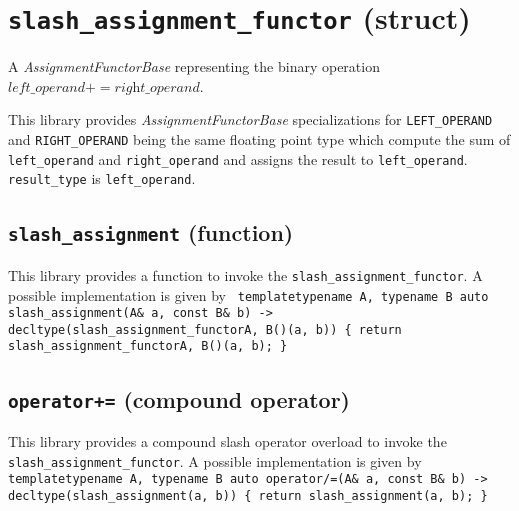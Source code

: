 \section{\texttt{slash\_assignment\_functor} (struct)}
A \textit{AssignmentFunctorBase} representing the binary operation $\textit{left\_operand} += \textit{right\_operand}$.\newline

\noindent{}This library provides \textit{AssignmentFunctorBase} specializations for
\texttt{LEFT\_OPERAND} and \texttt{RIGHT\_OPERAND} being the same    floating point
type which compute  the sum of  \texttt{left\_operand} and \texttt{right\_operand}
and assigns the result to \texttt{left\_operand}.
\texttt{result\_type} is \texttt{left\_operand}.

\subsection{\texttt{slash\_assignment} (function)}
This library provides a function to invoke the \texttt{slash\_assignment\_functor}.
A possible implementation is given by\newline
\texttt{
template\textlangle typename A, typename B\textrangle\newline
auto slash\_assignment(A\& a, const B\& b) -> decltype(slash\_assignment\_functor\textlangle A, B\textrangle()(a, b))\newline
\{ return slash\_assignment\_functor\textlangle A, B\textrangle()(a, b); \}
}

\subsection{\texttt{operator+=} (compound operator)}
This library provides a compound slash operator overload to invoke the \texttt{slash\_assignment\_functor}.
A possible implementation is given by\newline
\texttt{
template\textlangle typename A, typename B\textrangle\newline
auto operator/=(A\& a, const B\& b) -> decltype(slash\_assignment(a, b))\newline
\{ return slash\_assignment(a, b); \}
}